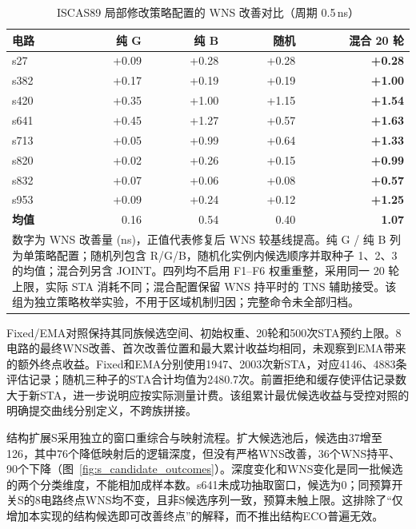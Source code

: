 \documentclass[twocolumn,10pt,fontset=windows]{ctexart}
\begin{document}
\begin{table}[H]
\centering
\caption{ISCAS89 局部修改策略配置的 WNS 改善对比（周期 0.5\,ns）}
\label{tab:ablation}
\scriptsize
\setlength{\tabcolsep}{3pt}
\begin{tabular}{lrrrr}
\toprule
\textbf{电路} & \textbf{纯 G} & \textbf{纯 B} & \textbf{随机} & \textbf{混合 20 轮} \\
\midrule
s27  & +0.09 & +0.28 & +0.28 & \textbf{+0.28} \\
s382 & +0.17 & +0.19 & +0.19 & \textbf{+1.00} \\
s420 & +0.35 & +1.00 & +1.15 & \textbf{+1.54} \\
s641 & +0.45 & +1.27 & +0.57 & \textbf{+1.63} \\
s713 & +0.05 & +0.99 & +0.64 & \textbf{+1.33} \\
s820 & +0.02 & +0.26 & +0.15 & \textbf{+0.99} \\
s832 & +0.07 & +0.06 & +0.08 & \textbf{+0.57} \\
s953 & +0.09 & +0.24 & +0.12 & \textbf{+1.25} \\
\midrule
\textbf{均值} & 0.16 & 0.54 & 0.40 & \textbf{1.07} \\
\bottomrule
\multicolumn{5}{p{0.92\columnwidth}}{\footnotesize 数字为 WNS 改善量 (ns)，正值代表修复后 WNS 较基线提高。纯 G / 纯 B 列为单策略配置；随机列包含 R/G/B，随机化实例内候选顺序并取种子 1、2、3 的均值；混合列另含 JOINT。四列均不启用 F1--F6 权重重整，采用同一 20 轮上限，实际 STA 消耗不同；混合配置保留 WNS 持平时的 TNS 辅助接受。该组为独立策略枚举实验，不用于区域机制归因；完整命令未全部归档。} \\
\end{tabular}
\end{table}
Fixed/EMA对照保持其同族候选空间、初始权重、20轮和500次STA预约上限。8电路的最终WNS改善、首次改善位置和最大累计收益均相同，未观察到EMA带来的额外终点收益。Fixed和EMA分别使用1947、2003次新STA，对应4146、4883条评估记录；随机三种子的STA合计均值为2480.7次。前置拒绝和缓存使评估记录数大于新STA，进一步说明应按实际测量计费。该组累计最优候选收益与受控对照的明确提交曲线分别定义，不跨族拼接。

结构扩展S采用独立的窗口重综合与映射流程。扩大候选池后，候选由37增至126，其中76个降低映射后的逻辑深度，但没有严格WNS改善，36个WNS持平、90个下降（图~\ref{fig:s_candidate_outcomes}）。深度变化和WNS变化是同一批候选的两个分类维度，不能相加成样本数。s641未成功抽取窗口，候选为0；同预算开关S的8电路终点WNS均不变，且非S候选序列一致，预算未触上限。这排除了“仅增加本实现的结构候选即可改善终点”的解释，而不推出结构ECO普遍无效。
\end{document}
